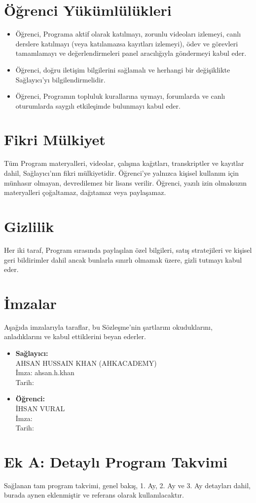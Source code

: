 \documentclass[a4paper,12pt]{article}
\begin{document}
\section{Öğrenci Yükümlülükleri}
\begin{itemize}[leftmargin=*]
    \item Öğrenci, Programa aktif olarak katılmayı, zorunlu videoları izlemeyi, canlı derslere katılmayı (veya katılamazsa kayıtları izlemeyi), ödev ve görevleri tamamlamayı ve değerlendirmeleri panel aracılığıyla göndermeyi kabul eder.
    \item Öğrenci, doğru iletişim bilgilerini sağlamalı ve herhangi bir değişiklikte Sağlayıcı'yı bilgilendirmelidir.
    \item Öğrenci, Programın topluluk kurallarına uymayı, forumlarda ve canlı oturumlarda saygılı etkileşimde bulunmayı kabul eder.
\end{itemize}

\section{Fikri Mülkiyet}
Tüm Program materyalleri, videolar, çalışma kağıtları, transkriptler ve kayıtlar dahil, Sağlayıcı'nın fikri mülkiyetidir. Öğrenci'ye yalnızca kişisel kullanım için münhasır olmayan, devredilemez bir lisans verilir. Öğrenci, yazılı izin olmaksızın materyalleri çoğaltamaz, dağıtamaz veya paylaşamaz.

\section{Gizlilik}
Her iki taraf, Program sırasında paylaşılan özel bilgileri, satış stratejileri ve kişisel geri bildirimler dahil ancak bunlarla sınırlı olmamak üzere, gizli tutmayı kabul eder.

\section{İmzalar}
Aşağıda imzalarıyla taraflar, bu Sözleşme'nin şartlarını okuduklarını, anladıklarını ve kabul ettiklerini beyan ederler.

\begin{itemize}[leftmargin=*]
    \item \textbf{Sağlayıcı:} \\
    AHSAN HUSSAIN KHAN (AHKACADEMY) \\
    İmza: ahsan.h.khan \\
    Tarih: \underline{\hspace{3cm}}
    \item \textbf{Öğrenci:} \\
    İHSAN VURAL \\
    İmza: \underline{\hspace{3cm}} \\
    Tarih: \underline{\hspace{3cm}}
\end{itemize}

\section*{Ek A: Detaylı Program Takvimi}
Sağlanan tam program takvimi, genel bakış, 1. Ay, 2. Ay ve 3. Ay detayları dahil, burada aynen eklenmiştir ve referans olarak kullanılacaktır.
\end{document}
